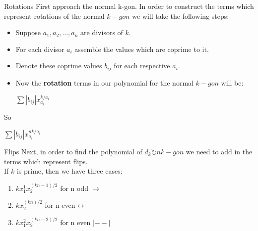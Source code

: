 \documentclass{beamer}
\begin{document}
\begin{frame}{Rotations}
    First approach the normal k-gon. In order to construct the terms which represent rotations of the normal $k-gon$ we will take the following steps:\\
\end{frame}
\begin{frame}
	\begin{itemize}
		\item	Suppose $a_1,a_2,...,a_n$ are divisors of $k$.\\
 		\item For each divisor $a_i$ assemble the values which are coprime to it. \\
		\item Denote these coprime values $b_{ij}$ for each respective $a_i$.\\
		\item Now the \textbf{rotation} terms in our polynomial for the normal $k-gon$ will be:\\
		\begin{center}
        $\sum |b_{ij}|x^{k/a_i}_{a_i}$
        \end{center}
	\end{itemize}
\end{frame}
\begin{frame}{}
So 
\begin{center}
        $\sum |b_{ij}|x^{nk/a_i}_{a_i}$
        \end{center}
\end{frame}

\begin{frame}{Flips}
 Next, in order to find the polynomial of $d_k \circlearrowright nk-gon$ we need to add in the terms which represent flips.\\
	If $k$ is prime, then we have three cases:
			\begin{enumerate}
				\item $ kx_1^1x_2^{(kn-1)/2}$  for n odd $\longmapsto$\\
				\item $kx_2^{(kn)/2}$ for n even$\longleftrightarrow$\\
                \item $kx_1^2 x_2^{(kn-2)/2}$ for n even $|--|$\\
			\end{enumerate}
		  
\end{frame}
\end{document}
